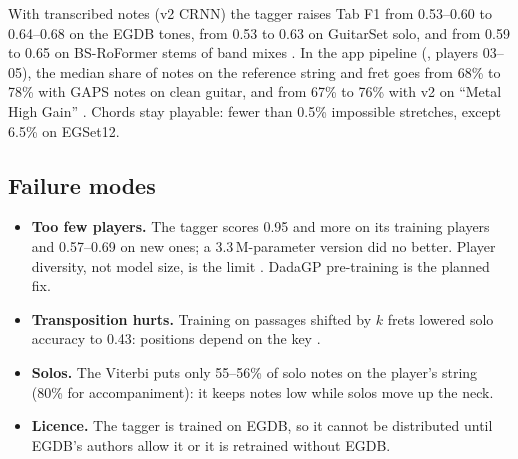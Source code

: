 With transcribed notes (v2 CRNN) the tagger raises Tab F1 from 0.53--0.60 to
0.64--0.68 on the EGDB tones, from 0.53 to 0.63 on GuitarSet solo, and from
0.59 to 0.65 on BS-RoFormer stems of band mixes \measured. In the app pipeline
(, players 03--05), the median share of notes on the
reference string and fret goes from 68\% to 78\% with GAPS notes on clean
guitar, and from 67\% to 76\% with v2 on ``Metal High Gain'' \measured.
Chords stay playable: fewer than 0.5\% impossible stretches, except 6.5\% on
EGSet12.

\subsection{Failure modes}
\begin{itemize}
\item \textbf{Too few players.} The tagger scores 0.95 and more on its training
  players and 0.57--0.69 on new ones; a 3.3\,M-parameter version did no better.
  Player diversity, not model size, is the limit \measured. DadaGP
  pre-training is the planned fix.
\item \textbf{Transposition hurts.} Training on passages shifted by $k$ frets
  lowered solo accuracy to 0.43: positions depend on the key \measured.
\item \textbf{Solos.} The Viterbi puts only 55--56\% of solo notes on the
  player's string (80\% for accompaniment): it keeps notes low while solos move
  up the neck.
\item \textbf{Licence.} The tagger is trained on EGDB, so it cannot be
  distributed until EGDB's authors allow it or it is retrained without EGDB.
\end{itemize}
